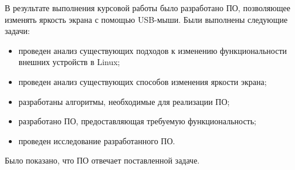 В результате выполнения курсовой работы было разработано ПО, позволяющее изменять яркость экрана с помощью USB-мыши. 
Были выполнены следующие задачи:
\begin{itemize}
	\item проведен анализ существующих подходов к изменению функциональности внешних устройств в Linux;
	\item проведен анализ существующих способов изменения яркости экрана;
	\item разработаны алгоритмы, необходимые для реализации ПО;
	\item разработано ПО, предоставляющая требуемую функциональность;
	\item проведен исследование разработанного ПО.
\end{itemize}

Было показано, что ПО отвечает поставленной задаче.